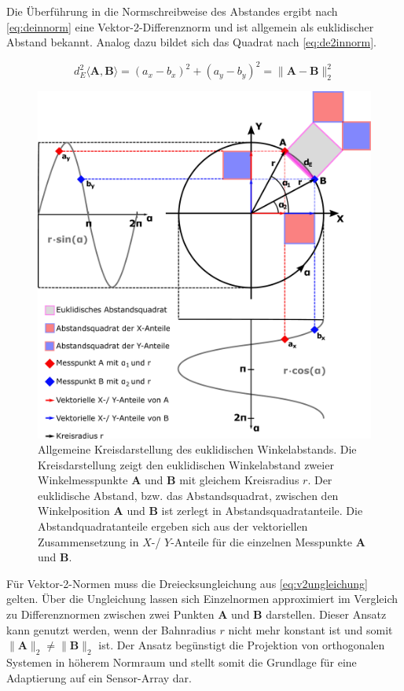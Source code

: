 \clearpage


Die Überführung in die Normschreibweise des Abstandes ergibt nach \autoref{eq:deinnorm} eine Vektor-2-Differenznorm und ist allgemein als euklidischer Abstand bekannt. Analog dazu bildet sich das Quadrat nach \autoref{eq:de2innorm}.


\begin{equation}\label{eq:de2innorm}
d_E^2\langle\mathbf{A},\mathbf{B}\rangle = (a_x - b_x)^2 + (a_y - b_y)^2 = \|\mathbf{A} - \mathbf{B}\|_2^2
\end{equation}

\vspace{5mm}
\begin{figure}[bph]
	\centering
	\includegraphics[width=0.7\linewidth]{chapters/images/2-Grundlagen/Kreisdarstellung_Winkelabstand}
	\caption[Allgemeine Kreisdarstellung des euklidischen Winkelabstands]{Allgemeine Kreisdarstellung des euklidischen 
		Winkelabstands. Die Kreisdarstellung zeigt den euklidischen Winkelabstand zweier Winkelmesspunkte $\mathbf{A}$ 
		und $\mathbf{B}$ mit gleichem Kreisradius $r$. Der euklidische Abstand, bzw. das Abstandsquadrat, zwischen den 
		Winkelposition $\mathbf{A}$ und $\mathbf{B}$ ist zerlegt in Abstandsquadratanteile. Die Abstandquadratanteile 
		ergeben sich aus der vektoriellen Zusammensetzung in $X$-/ $Y$-Anteile für die einzelnen Messpunkte 
		$\mathbf{A}$ und $\mathbf{B}$.}
	\label{fig:kreisdarstellungwinkelabstand}
\end{figure}


\clearpage


Für Vektor-2-Normen muss die Dreiecksungleichung aus \autoref{eq:v2ungleichung} \cite{Plum2012}\cite{vandeGeijn2014} gelten. Über die Ungleichung lassen sich Einzelnormen approximiert im Vergleich zu Differenznormen zwischen zwei Punkten $\mathbf{A}$ und $\mathbf{B}$ darstellen. Dieser Ansatz kann genutzt werden, wenn der Bahnradius $r$ nicht mehr konstant ist und somit $\|\mathbf{A}\|_2 \ne \|\mathbf{B}\|_2$ ist. Der Ansatz begünstigt die Projektion von orthogonalen Systemen in höherem Normraum \cite{Plum2012} und stellt somit die Grundlage für eine Adaptierung auf ein Sensor-Array dar.



